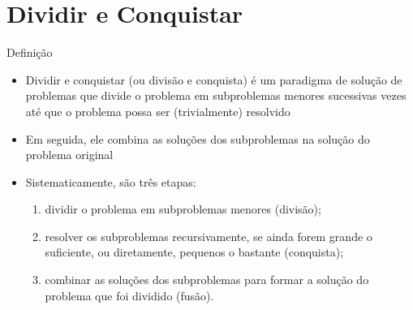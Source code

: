 \section{Dividir e Conquistar}

\begin{frame}[fragile]{Definição}

    \begin{itemize}
        \item Dividir e conquistar (ou divisão e conquista) é um paradigma de solução de problemas
            que divide o problema em subproblemas menores sucessivas vezes até que o problema
            possa ser (trivialmente) resolvido

        \item Em seguida, ele combina as soluções dos subproblemas na solução do problema original

        \item Sistematicamente, são três etapas:

        \begin{enumerate}
            \item dividir o problema em subproblemas menores (divisão);

            \item resolver os subproblemas recursivamente, se ainda forem grande o suficiente,
                ou diretamente, pequenos o bastante (conquista);

            \item combinar as soluções dos subproblemas para formar a solução do problema
                que foi dividido (fusão).
        \end{enumerate}

    \end{itemize}

\end{frame}

